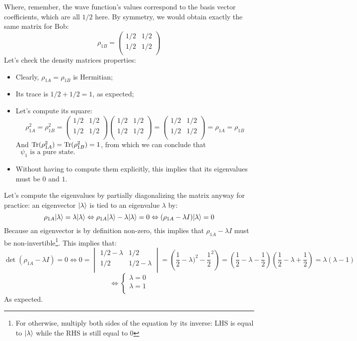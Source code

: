 \documentclass[solutions.tex]{subfiles}
\begin{document}
Where, remember, the wave function's values correspond to the basis
vector coefficients, which are all $1/2$ here. By symmetry, we would
obtain exactly the same matrix for Bob:
\[
	\rho_{1B} = \boxed{\begin{pmatrix}
		1/2 & 1/2 \\
		1/2 & 1/2 \\
	\end{pmatrix}}
\]
Let's check the density matrices properties:
\begin{itemize}
	\item Clearly, $\rho_{1A}=\rho_{1B}$ is Hermitian;
	\item Its trace is $1/2+1/2=1$, as expected;
	\item Let's compute its square:
	\[
		\rho_{1A}^2=\rho_{1B}^2 = \begin{pmatrix}
			1/2 & 1/2 \\
			1/2 & 1/2 \\
		\end{pmatrix}\begin{pmatrix}
			1/2 & 1/2 \\
			1/2 & 1/2 \\
		\end{pmatrix} = \begin{pmatrix}
			1/2 & 1/2 \\
			1/2 & 1/2 \\
		\end{pmatrix} = \rho_{1A}=\rho_{1B}
	\]
	And $\text{Tr}(\rho_{1A}^2) = \text{Tr}(\rho_{1B}^2) = 1$, from which we
	can conclude that $\boxed{\text{ $\psi_1$ is a pure state.}}$
	\item Without having to compute them explicitly, this implies that its eigenvalues must be $0$ and $1$.
\end{itemize}
Let's compute the eigenvalues by partially diagonalizing the matrix
anyway for practice: an eigenvector $|\lambda\rangle$ is tied to an
eigenvalue $\lambda$ by:
\[
	\rho_{1A}|\lambda\rangle = \lambda|\lambda\rangle
	\Leftrightarrow \rho_{1A}|\lambda\rangle - \lambda|\lambda\rangle = 0
	\Leftrightarrow (\rho_{1A}-\lambda I)|\lambda\rangle = 0
\]
Because an eigenvector is by definition non-zero, this implies that
$\rho_{1A}-\lambda I$ must be non-invertible\footnote{For otherwise,
multiply both sides of the equation by its inverse: LHS is equal to
$|\lambda\rangle$ while the RHS is still equal to 0}. This implies
that:
\[
	\det(\rho_{1A}-\lambda I) = 0
	\Leftrightarrow 0 = \begin{vmatrix}
		1/2-\lambda & 1/2 \\
		1/2 & 1/2-\lambda \\
	\end{vmatrix} = \left(\frac12-\lambda)^2-\frac12^2\right)
	= (\frac12-\lambda-\frac12)(\frac12-\lambda+\frac12)
	= \lambda(\lambda-1)
\]
\[
	\Leftrightarrow \boxed{\begin{cases}
		\lambda = 0 \\
		\lambda = 1 \\
	\end{cases}}
\]
As expected.
\end{document}
